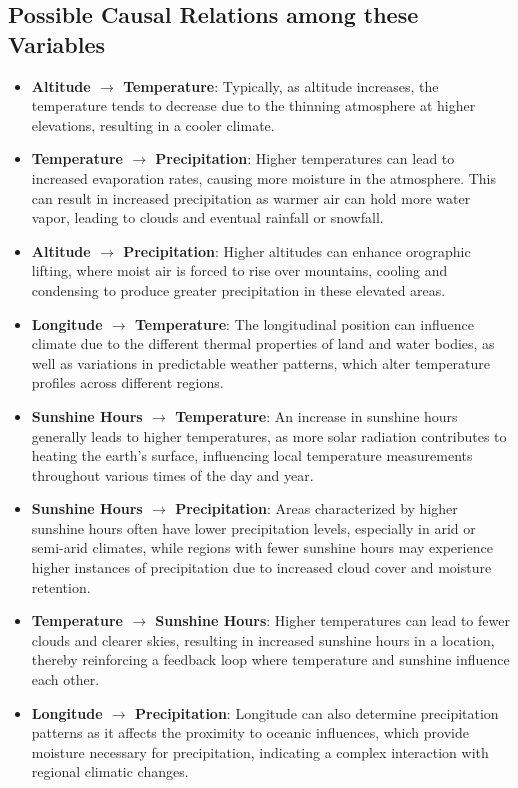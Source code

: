 \documentclass{article}
\begin{document}
\subsection{Possible Causal Relations among these Variables}
\begin{minipage}[t]{0.7\linewidth}
    \begin{itemize}
    \item \textbf{Altitude $\rightarrow$ Temperature}: Typically, as altitude increases, the temperature tends to decrease due to the thinning atmosphere at higher elevations, resulting in a cooler climate.
    \item \textbf{Temperature $\rightarrow$ Precipitation}: Higher temperatures can lead to increased evaporation rates, causing more moisture in the atmosphere. This can result in increased precipitation as warmer air can hold more water vapor, leading to clouds and eventual rainfall or snowfall.
    \item \textbf{Altitude $\rightarrow$ Precipitation}: Higher altitudes can enhance orographic lifting, where moist air is forced to rise over mountains, cooling and condensing to produce greater precipitation in these elevated areas.
    \item \textbf{Longitude $\rightarrow$ Temperature}: The longitudinal position can influence climate due to the different thermal properties of land and water bodies, as well as variations in predictable weather patterns, which alter temperature profiles across different regions.
    \item \textbf{Sunshine Hours $\rightarrow$ Temperature}: An increase in sunshine hours generally leads to higher temperatures, as more solar radiation contributes to heating the earth's surface, influencing local temperature measurements throughout various times of the day and year.
    \item \textbf{Sunshine Hours $\rightarrow$ Precipitation}: Areas characterized by higher sunshine hours often have lower precipitation levels, especially in arid or semi-arid climates, while regions with fewer sunshine hours may experience higher instances of precipitation due to increased cloud cover and moisture retention.
    \item \textbf{Temperature $\rightarrow$ Sunshine Hours}: Higher temperatures can lead to fewer clouds and clearer skies, resulting in increased sunshine hours in a location, thereby reinforcing a feedback loop where temperature and sunshine influence each other.
    \item \textbf{Longitude $\rightarrow$ Precipitation}: Longitude can also determine precipitation patterns as it affects the proximity to oceanic influences, which provide moisture necessary for precipitation, indicating a complex interaction with regional climatic changes.
\end{itemize}
\vfill
\end{minipage}
\end{document}
